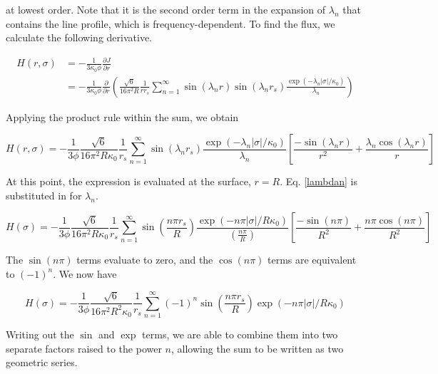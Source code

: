 \documentclass[onecolumn]{aastex63}
\begin{document}
at lowest order. Note that it is the second order term in the expansion of $\lambda_n$ that contains the line profile, which is frequency-dependent. To find the flux, we calculate the following derivative.

\begin{equation}
    \begin{split}
    H(r, \sigma) &= - \frac{1}{3\kappa_0 \phi}\frac{\partial J}{\partial r}\\
    &= - \frac{1}{3\kappa_0 \phi}\frac{\partial}{\partial r}\left(\frac{\sqrt{6}}{16 \pi^2 R} \frac{1}{rr_s} \sum_{n=1}^{\infty}\sin(\lambda_n r) \sin(\lambda_n r_s) \frac{\exp{(-\lambda_n |\sigma|/\kappa_0)}}{\lambda_n}\right)
    \end{split}
\end{equation}

Applying the product rule within the sum, we obtain

\begin{equation}
    H(r, \sigma) = - \frac{1}{3 \phi} \frac{\sqrt{6}}{16 \pi^2 R \kappa_0} \frac{1}{r_s} \sum_{n=1}^{\infty} \sin(\lambda_n r_s) \frac{\exp{(-\lambda_n |\sigma|/\kappa_0)}}{\lambda_n} \left[ \frac{-\sin(\lambda_n r)}{r^2} + \frac{\lambda_n \cos(\lambda_n r)}{r}\right]
\end{equation}

At this point, the expression is evaluated at the surface, $r=R$. Eq. \ref{lambdan} is substituted in for $\lambda_n$.

\begin{equation}
    H(\sigma) = - \frac{1}{3 \phi} \frac{\sqrt{6}}{16 \pi^2 R \kappa_0} \frac{1}{r_s} \sum_{n=1}^{\infty} \sin{\left(\frac{n\pi r_s}{R}\right)} \frac{\exp{(-n \pi |\sigma|/R\kappa_0)}}{\left(\frac{n\pi}{R}\right)} \left[ \frac{-\sin(n \pi)}{R^2} + \frac{n \pi \cos(n \pi)}{R^2}\right]
\end{equation}

The $\sin(n\pi)$ terms evaluate to zero, and the $\cos(n\pi)$ terms are equivalent to $(-1)^n$. We now have

\begin{equation}
    H(\sigma) = - \frac{1}{3 \phi} \frac{\sqrt{6}}{16 \pi^2 R^2 \kappa_0} \frac{1}{r_s} \sum_{n=1}^{\infty} (-1)^n \sin{\left(\frac{n\pi r_s}{R}\right)} \exp{(-n \pi |\sigma|/R\kappa_0)}
\end{equation}

Writing out the $\sin$ and $\exp$ terms, we are able to combine them into two separate factors raised to the power $n$, allowing the sum to be written as two geometric series.
\end{document}

